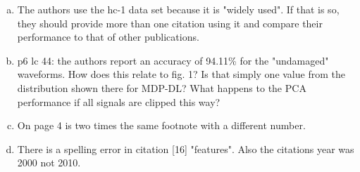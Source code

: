 \begin{enumerate}[a.]
	\item The authors use the hc-1 data set because it is "widely used". If that is so, they should provide more than one citation using it and compare their performance to that of other publications.
	
	
	\item p6 lc 44: the authors report an accuracy of 94.11\% for the "undamaged" waveforms. How does this relate to fig. 1? Is that simply one value from the distribution shown there for MDP-DL? What happens to the PCA performance if all signals are clipped this way?

	
	\item On page 4 is two times the same footnote with a different number.
	
	
	\item There is a spelling error in citation [16] "features". Also the citations year was 2000 not 2010. 
	
	
		
\end{enumerate}



% 







